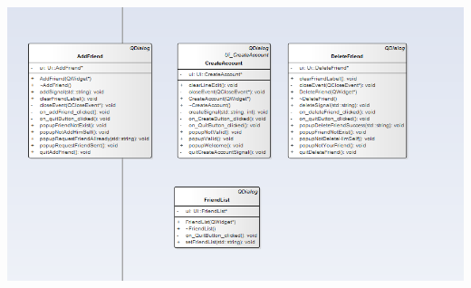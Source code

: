 \documentclass[12pt,a4paper]{article}
\begin{document}
  \includegraphics[height=20cm,width=20cm]{guiClass2.PNG}
  
\end{document}
